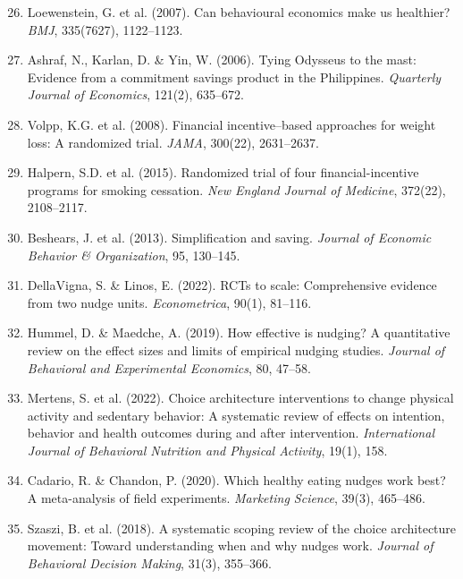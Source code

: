 \begin{enumerate}
    \setcounter{enumi}{25}
    \item Loewenstein, G. et al. (2007). Can behavioural economics make us healthier? \textit{BMJ}, 335(7627), 1122--1123.
    \item Ashraf, N., Karlan, D. \& Yin, W. (2006). Tying Odysseus to the mast: Evidence from a commitment savings product in the Philippines. \textit{Quarterly Journal of Economics}, 121(2), 635--672.
    \item Volpp, K.G. et al. (2008). Financial incentive–based approaches for weight loss: A randomized trial. \textit{JAMA}, 300(22), 2631--2637.
    \item Halpern, S.D. et al. (2015). Randomized trial of four financial-incentive programs for smoking cessation. \textit{New England Journal of Medicine}, 372(22), 2108--2117.
    \item Beshears, J. et al. (2013). Simplification and saving. \textit{Journal of Economic Behavior \& Organization}, 95, 130--145.
    \item DellaVigna, S. \& Linos, E. (2022). RCTs to scale: Comprehensive evidence from two nudge units. \textit{Econometrica}, 90(1), 81--116.
    \item Hummel, D. \& Maedche, A. (2019). How effective is nudging? A quantitative review on the effect sizes and limits of empirical nudging studies. \textit{Journal of Behavioral and Experimental Economics}, 80, 47--58.
    \item Mertens, S. et al. (2022). Choice architecture interventions to change physical activity and sedentary behavior: A systematic review of effects on intention, behavior and health outcomes during and after intervention. \textit{International Journal of Behavioral Nutrition and Physical Activity}, 19(1), 158.
    \item Cadario, R. \& Chandon, P. (2020). Which healthy eating nudges work best? A meta-analysis of field experiments. \textit{Marketing Science}, 39(3), 465--486.
    \item Szaszi, B. et al. (2018). A systematic scoping review of the choice architecture movement: Toward understanding when and why nudges work. \textit{Journal of Behavioral Decision Making}, 31(3), 355--366.
\end{enumerate}

